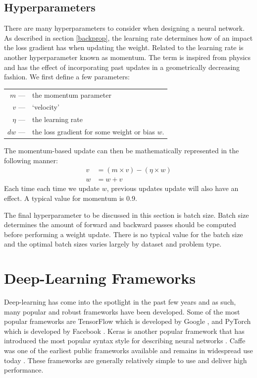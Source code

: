 \subsection{Hyperparameters}
There are many hyperparameters to consider when designing a neural network. As described in section \ref{backprop}, the learning rate determines how of an impact the loss gradient has when updating the weight. Related to the learning rate is another hyperparameter known as momentum. The term is inspired from physics and has the effect of incorporating past updates in a geometrically decreasing fashion. We first define a few parameters:
\begin{center}
	\begin{tabular} {r l}
		$m$  \hspace{12pt}---& the momentum parameter\\ 
		$v$  \hspace{12pt}---& `velocity' \\
		$\eta$ \hspace{12pt}---& the learning rate \\
		$dw$ \hspace{12pt}---& the loss gradient for some weight or bias $w$. 
	\end{tabular}
\end{center}The momentum-based update can then be mathematically represented in the following manner:
\begin{align*}
v &=  (m \times v) - (\eta \times w) \\
w &= w + v 
\end{align*}
Each time each time we update $w$, previous updates update will also have an effect. A typical value for momentum is 0.9.

The final hyperparameter to be discussed in this section is batch size. Batch size determines the amount of forward and backward passes should be computed before performing a weight update. There is no typical value for the batch size and the optimal batch sizes varies largely by dataset and problem type.

\section{Deep-Learning Frameworks}
Deep-learning has come into the spotlight in the past few years and as such, many popular and robust frameworks have been developed. Some of the most popular frameworks are TensorFlow which is developed by Google \cite{tensorflow2015-whitepaper}, and PyTorch which is developed by Facebook \cite{paszke2017automatic}. Keras is another popular framework that has introduced the most popular syntax style for describing neural networks \cite{chollet2015keras}. Caffe was one of the earliest public frameworks available and remains in widespread use today \cite{caffe}. These frameworks are generally relatively simple to use and deliver high performance. 


